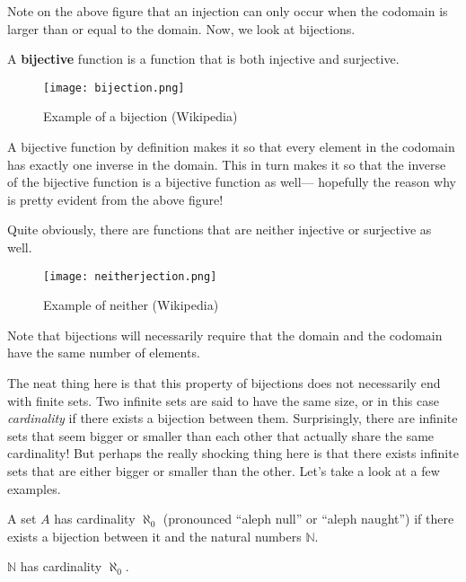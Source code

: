 Note on the above figure that an injection can only occur when the codomain is larger than or equal to the domain. Now, we look at bijections.
  
\begin{definition}
    A \textbf{bijective} function is a function that is both injective and surjective.
\end{definition}

\begin{figure}[H]
    \texttt{[image: bijection.png]}
    \centering
    \caption{Example of a bijection (Wikipedia)}
  \end{figure}

A bijective function by definition makes it so that every element in the codomain has exactly one inverse in the domain. This in turn makes it so that the inverse of the bijective function is a bijective function as well--- hopefully the reason why is pretty evident from the above figure!

Quite obviously, there are functions that are neither injective or surjective as well. 

\begin{figure}[H]
    \texttt{[image: neitherjection.png]}
    \centering
    \caption{Example of neither (Wikipedia)}
  \end{figure}

Note that bijections will necessarily require that the domain and the codomain have the same number of elements. 

The neat thing here is that this property of bijections does not necessarily end with finite sets. Two infinite sets are said to have the same size, or in this case \textit{cardinality} if there exists a bijection between them. Surprisingly, there are infinite sets that seem bigger or smaller than each other that actually share the same cardinality! But perhaps the really shocking thing here is that there exists infinite sets that are either bigger or smaller than the other. Let's take a look at a few examples.

\begin{definition}
    A set $A$ has cardinality $\aleph_0$ (pronounced ``aleph null'' or ``aleph naught'') if there exists a bijection between it and the natural numbers $\mathbb{N}$.
\end{definition}

\begin{example}
    $\mathbb{N}$ has cardinality $\aleph_0$. 
\end{example}

